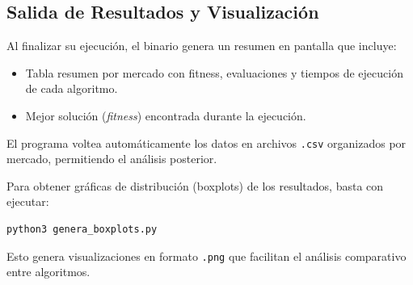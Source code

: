 \subsection{Salida de Resultados y Visualización}

Al finalizar su ejecución, el binario genera un resumen en pantalla que incluye:

\begin{itemize}[noitemsep]
    \item Tabla resumen por mercado con fitness, evaluaciones y tiempos de ejecución de cada algoritmo.
    \item Mejor solución (\textit{fitness}) encontrada durante la ejecución.
\end{itemize}

El programa voltea automáticamente los datos en archivos \texttt{.csv} organizados por mercado, permitiendo el análisis posterior.

Para obtener gráficas de distribución (boxplots) de los resultados, basta con ejecutar:

\begin{lstlisting}[language=bash, frame=single]
python3 genera_boxplots.py
\end{lstlisting}

Esto genera visualizaciones en formato \texttt{.png} que facilitan el análisis comparativo entre algoritmos.
